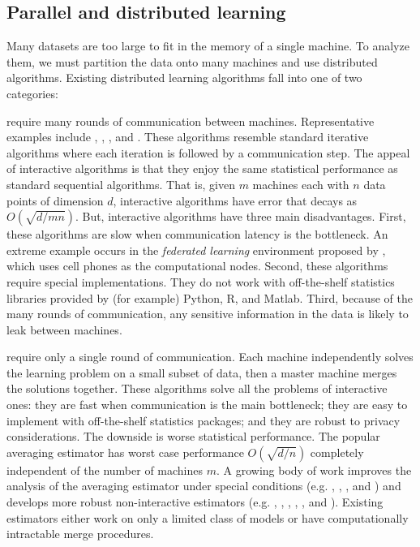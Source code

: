 \documentclass[thesis.tex]{subfiles}
\begin{document}

\subsection{Parallel and distributed learning}


Many datasets are too large to fit in the memory of a single machine.
To analyze them, we must partition the data onto many machines and use distributed algorithms.
Existing distributed learning algorithms fall into one of two categories:

 require many rounds of communication between machines.
Representative examples include \citet{boyd2011distributed}, \citet{li2014scaling}, \cite{ma2015adding}, and \cite{zhao2017scope}. 
These algorithms resemble standard iterative algorithms where each iteration is followed by a communication step. 
The appeal of interactive algorithms is that they enjoy the same statistical performance as standard sequential algorithms.
That is, given $m$ machines each with $n$ data points of dimension $d$, interactive algorithms have error that decays as $O(\sqrt{d/mn})$.
But, interactive algorithms have three main disadvantages.
First, these algorithms are slow when communication latency is the bottleneck.
An extreme example occurs in the \emph{federated learning} environment proposed by \cite{mcmahan2017communication}, which uses cell phones as the computational nodes. 
Second, these algorithms require special implementations.
They do not work with off-the-shelf statistics libraries provided by (for example) Python, R, and Matlab.
Third, because of the many rounds of communication, any sensitive information in the data is likely to leak between machines.

 require only a single round of communication.
Each machine independently solves the learning problem on a small subset of data,
then a master machine merges the solutions together.
These algorithms solve all the problems of interactive ones:
they are fast when communication is the main bottleneck;
they are easy to implement with off-the-shelf statistics packages;
and they are robust to privacy considerations.
The downside is worse statistical performance.
The popular averaging estimator has worst case performance $O(\sqrt{d/n})$ completely independent of the number of machines $m$. 
A growing body of work improves the analysis of the averaging estimator under special conditions 
(e.g.
\citet{mcdonald2009efficient},
\citet{zhang2012communication},
\citet{zhang2013divide},
and
\citet{rosenblatt2016optimality})
and develops more robust non-interactive estimators
(e.g.
\citet{zinkevich2010parallelized},
\citet{liu2014distributed},  
\citet{lee2015communication}, 
\citet{battey2015distributed},
\citet{han2016bootstrap},
and \citet{jordan2016communication}).
Existing estimators either work on only a limited class of models or have computationally intractable merge procedures.
\end{document}
